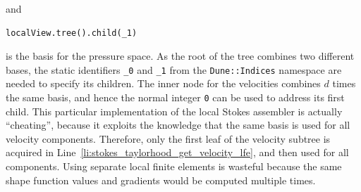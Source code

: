 \documentclass[a4paper,10pt,headings=normal,bibliography=totoc]{scrartcl}
\newcommand{\cpp}[1]{\lstinline[basicstyle=\ttfamily]!#1!}
\begin{document}
and
\begin{lstlisting}[style=Example]
localView.tree().child(_1)
\end{lstlisting}
is the basis for the pressure space.
As the root of the tree combines two different bases, the static identifiers \cpp{_0} and \cpp{_1}
from the \cpp{Dune::Indices} namespace are needed to specify its children.  The inner node for the velocities
combines $d$ times the same basis, and hence the normal integer \cpp{0} can be used to address its first child.
This particular implementation of the local Stokes assembler is actually ``cheating'', because it exploits the knowledge
that the same basis is used for all velocity components.  Therefore, only the first leaf of the velocity
subtree is acquired in Line~\ref{li:stokes_taylorhood_get_velocity_lfe}, and then used for all components.
Using separate local finite elements is wasteful because the same shape function values and gradients
would be computed multiple times.
\end{document}
